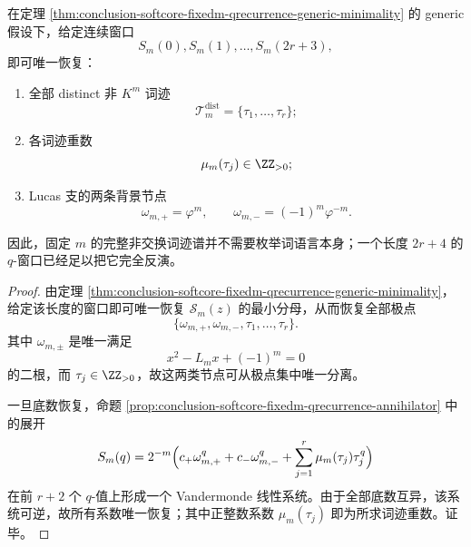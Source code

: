 \begin{theorem}\label{thm:conclusion-softcore-fixedm-wordtrace-spectrum-window-recovery}
在定理 \ref{thm:conclusion-softcore-fixedm-qrecurrence-generic-minimality} 的 generic 假设下，给定连续窗口
\[
S_m(0),S_m(1),\dots,S_m(2r+3),
\]
即可唯一恢复：
\begin{enumerate}
  \item 全部 distinct 非 \(K^m\) 词迹
  \[
  \mathcal T_m^{\mathrm{dist}}=\{\tau_1,\dots,\tau_r\};
  \]
  \item 各词迹重数
  \[
  \mu_m(\tau_j)\in\ZZ_{>0};
  \]
  \item Lucas 支的两条背景节点
  \[
  \omega_{m,+}=\varphi^m,\qquad \omega_{m,-}=(-1)^m\varphi^{-m}.
  \]
\end{enumerate}
因此，固定 \(m\) 的完整非交换词迹谱并不需要枚举词语言本身；一个长度 \(2r+4\) 的 \(q\)-窗口已经足以把它完全反演。
\end{theorem}
\begin{proof}
由定理 \ref{thm:conclusion-softcore-fixedm-qrecurrence-generic-minimality}，给定该长度的窗口即可唯一恢复 \(\mathcal S_m(z)\) 的最小分母，从而恢复全部极点
\[
\{\omega_{m,+},\omega_{m,-},\tau_1,\dots,\tau_r\}.
\]
其中 \(\omega_{m,\pm}\) 是唯一满足
\[
x^2-L_mx+(-1)^m=0
\]
的二根，而 \(\tau_j\in\ZZ_{>0}\)，故这两类节点可从极点集中唯一分离。

一旦底数恢复，命题 \ref{prop:conclusion-softcore-fixedm-qrecurrence-annihilator} 中的展开
\[
S_m(q)
=
2^{-m}\Bigl(c_+\omega_{m,+}^q+c_-\omega_{m,-}^q+\sum_{j=1}^{r}\mu_m(\tau_j)\tau_j^q\Bigr)
\]
在前 \(r+2\) 个 \(q\)-值上形成一个 Vandermonde 线性系统。由于全部底数互异，该系统可逆，故所有系数唯一恢复；其中正整数系数 \(\mu_m(\tau_j)\) 即为所求词迹重数。证毕。
\end{proof}

